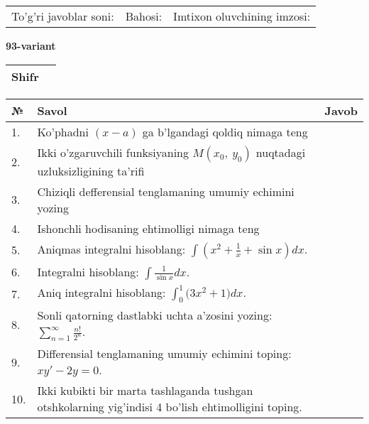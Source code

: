 \documentclass{article}
\begin{document}
  \vspace{1cm}
  
  \begin{tabular}{lll}
  To'g'ri javoblar soni: \underline{\hspace{1.5cm}} & 
  Bahosi: \underline{\hspace{1.5cm}} & 
  Imtixon oluvchining imzosi: \underline{\hspace{2cm}} \\
  \end{tabular}
  
  \egroup
  
  \newpage
  
  
  \textbf{93-variant}\\
  
  \bgroup
  \def\arraystretch{1.6} %
  
  \begin{tabular}{|m{5.7cm}|m{9.5cm}|}
  \hline
  Shifr & \\
  \hline
  \end{tabular}
  
  \vspace{1cm}
  
  \begin{tabular}{|m{0.7cm}|m{10cm}|m{4cm}|}
  \hline
  № & Savol & Javob \\
  \hline
  1. & Ko'phadni \((x - a)\) ga b'lgandagi qoldiq nimaga teng &  \\
  \hline
  2. & Ikki o'zgaruvchili funksiyaning \(M(x_{0},\ y_{0})\) nuqtadagi uzluksizligining ta'rifi &  \\
  \hline
  3. & Chiziqli defferensial tenglamaning umumiy echimini yozing &  \\
  \hline
  4. & Ishonchli hodisaning ehtimolligi nimaga teng &  \\
  \hline
  5. & Aniqmas integralni hisoblang: \(\int {\left( x^{2} + \frac{1}{x} + \sin x \right)dx}\). &  \\
  \hline
  6. & Integralni hisoblang: \(\int {\frac{1}{\sin x}dx}\). &  \\
  \hline
  7. & Aniq integralni hisoblang: \(\int_{0}^{1}{(3x^{2}} + 1)dx\). &  \\
  \hline
  8. & Sonli qatorning dastlabki uchta a'zosini yozing: \(\sum_{n = 1}^{\infty}\frac{n!}{2^{n}}\). &  \\
  \hline
  9. & Differensial tenglamaning umumiy echimini toping: \(xy' - 2y = 0\). &  \\
  \hline
  10. & Ikki kubikti bir marta tashlaganda tushgan otshkolarning yig'indisi 4 bo'lish ehtimolligini toping. &  \\
  \hline
  \end{tabular}
  
\end{document}
